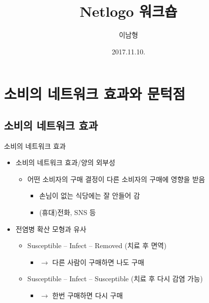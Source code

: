 \documentclass[hyperref={unicode}]{beamer}
\title{Netlogo 워크숍}
\author{이남형\inst{1}}
\institute{\inst{1} 연세대학교 경영연구소}
\date{2017.11.10.}
\begin{document}
\begin{frame}[plain]
\titlepage	
\end{frame}

\begin{frame}
\tableofcontents	
\end{frame}


\section{소비의 네트워크 효과와 문턱점}
\subsection{소비의 네트워크 효과}
\begin{frame}{소비의 네트워크 효과}
\begin{itemize}
\item 소비의 네트워크 효과/양의 외부성  \cite{Arthur:1990fk}
	\begin{itemize}
	\item 어떤 소비자의 구매 결정이 다른 소비자의 구매에 영향을 받음
		\begin{itemize}
		\item 손님이 없는 식당에는 잘 안들어 감 \cite{Granovetter:1986aa}
		\item (휴대)전화, SNS 등
		\end{itemize}
	\end{itemize}
\item 전염병 확산 모형과 유사
	\begin{itemize}
	\item Susceptible -- Infect -- Removed (치료 후 면역)
		\begin{itemize}
		\item $\rightarrow$ 다른 사람이 구매하면 나도 구매
		\end{itemize}
	\item Susceptible -- Infect -- Susceptible (치료 후 다시 감염 가능)
		\begin{itemize}
		\item $\rightarrow$ 한번 구매하면 다시 구매
		\end{itemize}
	\end{itemize}
\end{itemize}
\end{frame}	
\end{document}
